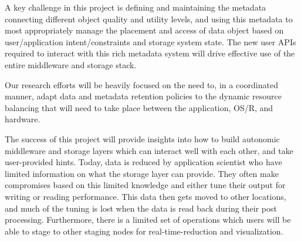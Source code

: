 \documentclass[11pt,letterpaper]{article}
\begin{document}
A key challenge in this project is defining and maintaining the metadata
connecting different object quality and utility levels, and using this metadata 
to most appropriately manage the placement and access of data object based on 
user/application intent/constraints and storage system state.
The new user APIs required to interact with this rich metadata system will
drive effective use of the entire middleware and storage stack.

Our research efforts will be heavily focused on the need to, in a
coordinated manner, adapt data and metadata retention policies to the
dynamic resource balancing that will need to take place between the
application, OS/R, and hardware.

The success of this project will provide insights into how to build
autonomic middleware and storage layers which can interact well with each
other, and take user-provided hints. Today, data is reduced by application
scientist who have limited information on what the storage layer can
provide. They often make compromises based on this limited knowledge and
either tune their output for writing or reading performance. This data then
gets moved to other locations, and much of the tuning is lost when the data
is read back during their post processing. Furthermore, there is a limited
set of operations which users will be able to stage to other staging nodes
for real-time-reduction and visualization.


%  
\end{document}
